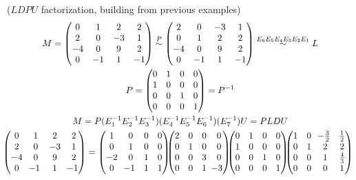 \begin{example} ($LDPU$ factorization, building from previous examples)
\begin{gather*}
M=
\begin{pmatrix}
0&1&2&2\\
2&0&-3&1\\
-4&0&9&2\\
0&-1&1&-1
\end{pmatrix}
\stackrel{P}{\sim}
\begin{pmatrix}
2&0&-3&1\\
0&1&2&2\\
-4&0&9&2\\
0&-1&1&-1
\end{pmatrix}
\stackrel{E_6E_5E_4E_3E_2E_1}{\sim} L\\
P=
\begin{pmatrix}
0&1&0&0\\
1&0&0&0\\
0&0&1&0\\
0&0&0&1
\end{pmatrix}
=P^{-1}\\
M=P(E_1^{-1}E_2^{-1}E_3^{-1})(E_4^{-1}E_5^{-1}E_6^{-1}) (E_7^{-1}) U=PLDU\\\smallskip
\!\!\!\begin{pmatrix}
0&1&2&2\\
2&0&-3&1\\
-4&0&9&2\\
0&\!\!-1&1&\!\!-1
\end{pmatrix}
=
\begin{pmatrix}
1&0&0&0\\
0&1&0&0\\
-2&0&1&0\\
0&\!\!-1&1&1
\end{pmatrix} 
\!\!\!
\begin{pmatrix}
2&0&0&0\\
0&1&0&0\\
0&0&3&0\\
0&0&1&\!\!\!-3
\end{pmatrix} 
\!\!\!
\begin{pmatrix}
0&1&0&0\\
1&0&0&0\\
0&0&1&0\\
0&0&0&1
\end{pmatrix}
\!\!\!
\begin{pmatrix}
1&0&\!\!-\frac{3}{2}&\frac{1}{2}\\
0&1&2&2\\
0&0&1&\frac43\\
0&0&0&1
\end{pmatrix}
\end{gather*}

\end{example}

